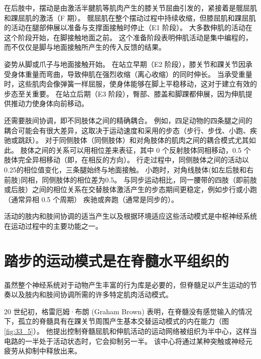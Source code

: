 在后肢中，摆动是由激活半腱肌等肌肉产生的膝关节屈曲引发的，紧接着是髋屈肌和踝屈肌的激活（F 期）。
髋屈肌在整个摆动过程中持续收缩，但膝屈肌和踝屈肌的活动在腿部伸展以准备与支撑面接触时停止（E1 阶段）。
大多数伸肌的活动在这个阶段开始，在脚接触地面之前。
这个准备阶段表明伸肌活动是集中编程的，而不仅仅是脚与地面接触所产生的传入反馈的结果。


姿势从脚或爪子与地面接触开始。 在站立早期（E2 阶段），膝关节和踝关节因承受身体重量而弯曲，导致伸肌在强烈收缩（离心收缩）的同时伸长。
当承受重量时，这些肌肉会像弹簧一样屈服，使身体能够在脚上平稳移动，这对于建立有效的步态至关重要。
在站立后期（E3 阶段），臀部、膝盖和脚踝都伸展，因为伸肌提供推动力使身体向前移动。


还需要肢间协调，即不同肢体之间的精确耦合。
例如，四足动物的四条腿之间的耦合可能会有很大差异，这取决于运动速度和采用的步态（步行、步伐、小跑、疾驰或跳跃）。
对于同侧肢体（同侧肢体）和对角肢体的肌肉之间的耦合模式尤其如此。
肢体之间的关系可以用相位差来表征，其中 0 个反射肢体同相移动，0.5 个肢体完全异相移动（即，在相反的方向）。
行走过程中，同侧肢体之间的活动以0.25的相位值变化，三条腿始终与地面接触。 小跑时，对角线肢体(如左后肢和右前肢)同相，同侧肢体的相位差为0.5。 与同步运动相比，同一腰带的四肢（即前肢或后肢）之间的相位关系在交替肢体激活产生的步态期间更稳定，例如步行或小跑（通常异相 0.5 个周期） 疾驰或奔跑（通常是同步的）。


活动的肢内和肢间协调的适当产生以及根据环境适应这些活动模式是中枢神经系统在运动过程中的主要功能之一。



\section{踏步的运动模式是在脊髓水平组织的}

虽然整个神经系统对于动物产生丰富的行为库是必要的，但脊髓足以产生运动的节奏以及肢内和肢间协调所需的许多特定肌肉活动模式。


20 世纪初，格雷厄姆·布朗 (Graham Brown) 表明，在脊髓没有感觉输入的情况下，孤立的脊髓具有在踝关节周围产生基本交替运动模式的内在能力（图 \ref{fig:33_5}）。
他提出控制脊髓屈肌和伸肌活动的运动网络被组织为半中心，这样当电路的一半处于活动状态时，它会抑制另一半。 该中心将通过某种突触或神经元疲劳从抑制中释放出来。



